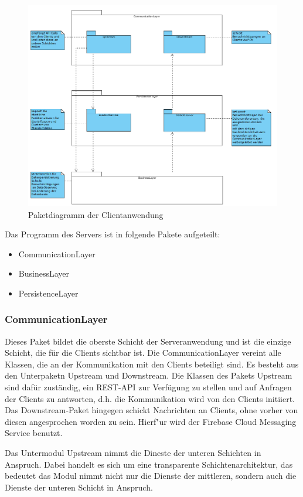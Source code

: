 \documentclass[parskip=full]{scrartcl}
\begin{document}
\begin{figure}[H]
	\centering
	\includegraphics[scale=0.5]{../Klassendiagramme/paketdiagramm_server.png}
	\caption{Paketdiagramm der Clientanwendung}
\end{figure}

Das Programm des Servers ist in folgende Pakete aufgeteilt:
\begin{itemize}
	\item CommunicationLayer
	\item BusinessLayer
	\item PersistenceLayer
\end{itemize}

\subsubsection{CommunicationLayer}
Dieses Paket bildet die oberste Schicht der Serveranwendung und ist die einzige Schicht, die für die Clients sichtbar ist. Die CommunicationLayer vereint alle Klassen, die an der Kommunikation mit den Clients beteiligt sind. Es besteht aus den Unterpaketn Upstream und Downstream. Die Klassen des Pakets Upstream sind dafür zuständig, ein REST-API zur Verfügung zu stellen und auf Anfragen der Clients zu antworten, d.h. die Kommunikation wird von den Clients initiiert. Das Downstream-Paket hingegen schickt Nachrichten an Clients, ohne vorher von diesen angesprochen worden zu sein. Hierf"ur wird der Firebase Cloud Messaging Service benutzt.

Das Untermodul Upstream nimmt die Dineste der unteren Schichten in Anspruch. Dabei handelt es sich um eine transparente Schichtenarchitektur, das bedeutet das Modul nimmt nicht nur die Dienste der mittleren, sondern auch die Dienste der unteren Schicht in Anspruch.
\end{document}
